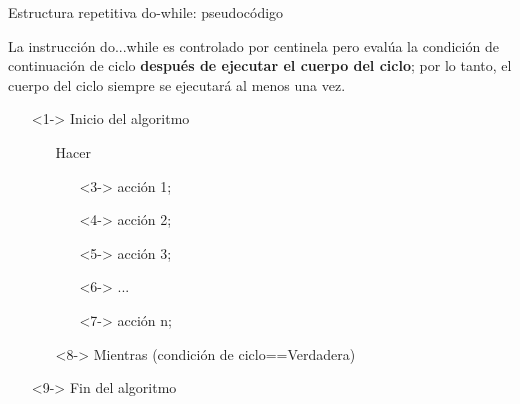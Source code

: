\documentclass[xcolor=pdftex,table,11pt]{beamer}
\begin{document}
\begin{frame}{Estructura repetitiva do-while: pseudocódigo}
\begin{block}{}
La instrucción do...while es controlado por centinela pero evalúa la condición de continuación de ciclo \textbf{después de ejecutar el cuerpo del ciclo}; por lo tanto, el cuerpo del ciclo siempre se ejecutará al menos una vez.
\end{block}


\begin{itemize}
   \item[]<1-> Inicio del algoritmo

   \begin{itemize}
   		\item[]Hacer
     	\begin{itemize}
     			\item[]<3->  acción 1;
     			\item[]<4->  acción 2;
     			\item[]<5->  acción 3;
     			\item[]<6->  ...
     			\item[]<7->  acción n;
     	\end{itemize}
     	\item[]<8-> Mientras (condición de ciclo==Verdadera)
   \end{itemize}
   
  \item[]<9-> Fin del algoritmo 
  
  
\end{itemize}



\end{frame}
\end{document}
